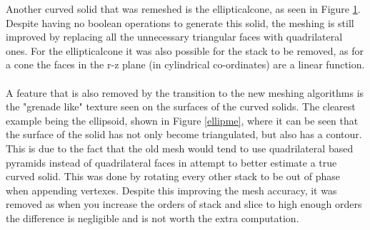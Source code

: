 \documentclass[12pt,a4paper]{article}
\begin{document}
\begin{figure}[h!]
\begin{minipage}{.4\textwidth}
  \label{elco1}
\end{minipage}%
\end{figure}

\noindent Another curved solid that was remeshed is the ellipticalcone, as seen in Figure \ref{elco1}. Despite having no boolean operations to generate this solid, the meshing is still improved by replacing all the unnecessary triangular faces with quadrilateral ones. For the ellipticalcone it was also possible for the stack to be removed, as for a cone the faces in the r-z plane (in cylindrical co-ordinates) are a linear function.
\\\\
\noindent A feature that is also removed by the transition to the new meshing algorithms is the "grenade like" texture seen on the surfaces of the curved solids. The clearest example being the ellipsoid, shown in Figure \ref{ellipme}, where it can be seen that the surface of the solid has not only become triangulated, but also has a contour. This is due to the fact that the old mesh would tend to use quadrilateral based pyramids instead of quadrilateral faces in attempt to better estimate a true curved solid. This was done by rotating every other stack to be out of phase when appending vertexes. Despite this improving the mesh accuracy, it was removed as when you increase the orders of stack and slice to high enough orders the difference is negligible and is not worth the extra computation.  
\end{document}
